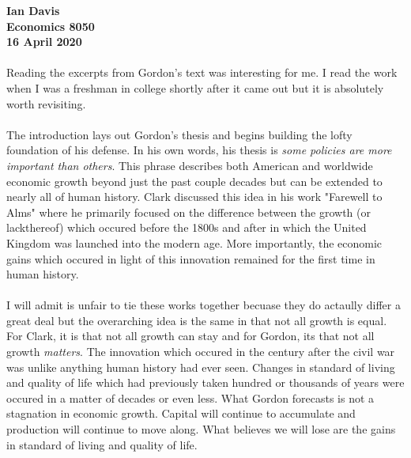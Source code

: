 
\let\counterwithout\relax
\let\counterwithin\relax
{}


\noindent \textbf{Ian Davis}\\
\noindent \textbf{Economics 8050}\\
\noindent \textbf{16 April 2020}\\
\\
Reading the excerpts from Gordon's text was interesting for me. I read the work when I was a freshman in college shortly after it came out but it is absolutely worth revisiting.\\
\\
The introduction lays out Gordon's thesis and begins building the lofty foundation of his defense. In his own words, his thesis is \textit{some policies are more important than others}. This phrase describes both American and worldwide economic growth beyond just the past couple decades but can be extended to nearly all of human history. Clark discussed this idea in his work "Farewell to Alms" where he primarily focused on the difference between the growth (or lackthereof) which occured before the 1800s and after in which the United Kingdom was launched into the modern age. More importantly, the economic gains which occured in light of this innovation remained for the first time in human history.\\
\\
I will admit is unfair to tie these works together becuase they do actaully differ a great deal but the overarching idea is the same in that not all growth is equal. For Clark, it is that not all growth can stay and for Gordon, its that not all growth \textit{matters}. The innovation which occured in the century after the civil war was unlike anything human history had ever seen. Changes in standard of living and quality of life which had previously taken hundred or thousands of years were occured in a matter of decades or even less. What Gordon forecasts is not a stagnation in economic growth. Capital will continue to accumulate and production will continue to move along. What believes we will lose are the gains in standard of living and quality of life.\\
\\
